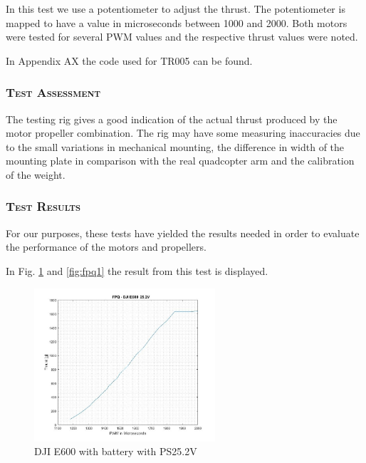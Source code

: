 In this test we use a potentiometer to adjust the thrust. The potentiometer is mapped to have a value in microseconds between 1000 and 2000. Both motors were tested for several PWM values and the respective thrust values were noted.

In Appendix AX the code used for TR005 can be found. 

\subsubsection*{\textsc{\medium Test Assessment}}
The testing rig gives a good indication of the actual thrust produced by the motor propeller combination. The rig may have some measuring inaccuracies due to the small variations in mechanical mounting, the difference in width of the mounting plate in comparison with the real quadcopter arm and the calibration of the weight.

\subsubsection*{\textsc{\medium Test Results}}
For our purposes, these tests have yielded the results needed in order to evaluate the performance of the motors and propellers.
                 
In Fig. \ref{fig:fpq3} and \ref{fig:fpq1} the result from this test is displayed. 

\begin{figure}[H]
    \centering
    \includegraphics[width = 0.6\textwidth]{VAPIQ-PICTURES/FPQ3}
    \caption{DJI E600 with battery with PS25.2V}
    \label{fig:fpq3}
\end{figure}

